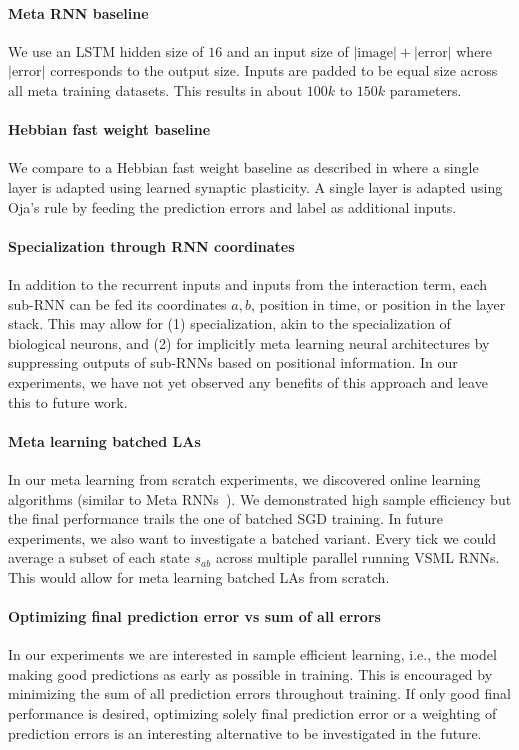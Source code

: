 \documentclass{article}
\newcommand{\approach}{VSML RNNs}
\newcommand{\metarnn}{Meta RNN}
\begin{document}
\paragraph{{\metarnn} baseline}
We use an LSTM hidden size of $16$ and an input size of $|\mathrm{image}| + |\mathrm{error}|$ where $|\mathrm{error}|$ corresponds to the output size.
Inputs are padded to be equal size across all meta training datasets.
This results in about $100k$ to $150k$ parameters.

\paragraph{Hebbian fast weight baseline}
We compare to a Hebbian fast weight baseline as described in \citet{Miconi2018DifferentiableBackpropagation} where a single layer is adapted using learned synaptic plasticity.
A single layer is adapted using Oja's rule by feeding the prediction errors and label as additional inputs.

\paragraph{Specialization through RNN coordinates}
In addition to the recurrent inputs and inputs from the interaction term, each sub-RNN can be fed its coordinates $a, b$, position in time, or position in the layer stack.
This may allow for (1) specialization, akin to the specialization of biological neurons, and (2) for implicitly meta learning neural architectures by suppressing outputs of sub-RNNs based on positional information.
In our experiments, we have not yet observed any benefits of this approach and leave this to future work.

\paragraph{Meta learning batched LAs}
In our meta learning from scratch experiments, we discovered online learning algorithms (similar to Meta RNNs~\citep{Hochreiter2001,Wang2016,Duan2016}).
We demonstrated high sample efficiency but the final performance trails the one of batched SGD training.
In future experiments, we also want to investigate a batched variant.
Every tick we could average a subset of each state $s_{ab}$ across multiple parallel running {\approach}.
This would allow for meta learning batched LAs from scratch.

\paragraph{Optimizing final prediction error vs sum of all errors}
In our experiments we are interested in sample efficient learning, i.e., the model making good predictions as early as possible in training.
This is encouraged by minimizing the sum of all prediction errors throughout training.
If only good final performance is desired, optimizing solely final prediction error or a weighting of prediction errors is an interesting alternative to be investigated in the future.
\end{document}
